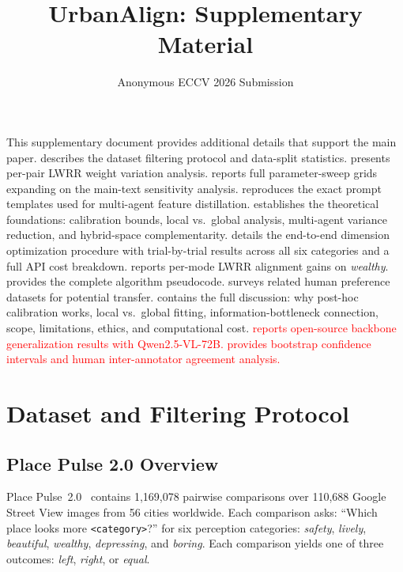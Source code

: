 \documentclass[runningheads]{llncs}
\begin{document}
\title{UrbanAlign: Supplementary Material}
\author{Anonymous ECCV 2026 Submission}
\maketitle

This supplementary document provides additional details that support the main paper.
 describes the dataset filtering protocol and data-split statistics.
 presents per-pair LWRR weight variation analysis.
 reports full parameter-sweep grids expanding on the main-text sensitivity analysis.
 reproduces the exact prompt templates used for multi-agent feature distillation.
 establishes the theoretical foundations: calibration bounds, local vs.\ global analysis, multi-agent variance reduction, and hybrid-space complementarity.
 details the end-to-end dimension optimization procedure with trial-by-trial results across all six categories and a full API cost breakdown.
 reports per-mode LWRR alignment gains on \emph{wealthy}.
 provides the complete algorithm pseudocode.
 surveys related human preference datasets for potential transfer.
 contains the full discussion: why post-hoc calibration works, local vs.\ global fitting, information-bottleneck connection, scope, limitations, ethics, and computational cost.
\textcolor{red}{ reports open-source backbone generalization results with Qwen2.5-VL-72B.
 provides bootstrap confidence intervals and human inter-annotator agreement analysis.}


\section{Dataset and Filtering Protocol}
\label{sec:dataset}

\subsection{Place Pulse 2.0 Overview}

Place Pulse~2.0~\cite{salesses2013collaborative} contains 1,169,078 pairwise comparisons over 110,688 Google Street View images from 56 cities worldwide.
Each comparison asks: ``Which place looks more \texttt{<category>}?'' for six perception categories: \emph{safety}, \emph{lively}, \emph{beautiful}, \emph{wealthy}, \emph{depressing}, and \emph{boring}.
Each comparison yields one of three outcomes: \emph{left}, \emph{right}, or \emph{equal}.
\end{document}
